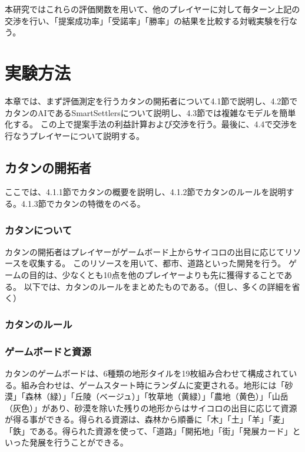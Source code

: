 \documentclass[a4, 10pt,dvipdfmx]{jsarticle}
\begin{document}
本研究ではこれらの評価関数を用いて、他のプレイヤーに対して毎ターン上記の交渉を行い、「提案成功率」「受諾率」「勝率」の結果を比較する対戦実験を行なう。

\section{実験方法}

本章では、まず評価測定を行うカタンの開拓者について4.1節で説明し、4.2節でカタンのAIであるSmartSettlersについて説明し、4.3節では複雑なモデルを簡単化する。
この上で提案手法の利益計算および交渉を行う。最後に、4.4で交渉を行なうプレイヤーについて説明する。

\subsection{カタンの開拓者}
ここでは、4.1.1節でカタンの概要を説明し、4.1.2節でカタンのルールを説明する。4.1.3節でカタンの特徴をのべる。

\subsubsection{カタンについて}
カタンの開拓者はプレイヤーがゲームボード上からサイコロの出目に応じてリソースを収集する。
このリソースを用いて、都市、道路といった開発を行う。
ゲームの目的は、少なくとも10点を他のプレイヤーよりも先に獲得することである。
以下では、カタンのルールをまとめたものである。（但し、多くの詳細を省く）
\subsubsection{カタンのルール}

\subsubsection*{ゲームボードと資源}
カタンのゲームボードは、6種類の地形タイルを19枚組み合わせて構成されている。組み合わせは、ゲームスタート時にランダムに変更される。地形には「砂漠」「森林（緑）」「丘陵（ベージュ）」「牧草地（黄緑）」「農地（黄色）」「山岳（灰色）」があり、砂漠を除いた残りの地形からはサイコロの出目に応じて資源が得る事ができる。得られる資源は、森林から順番に「木」「土」「羊」「麦」「鉄」である。得られた資源を使って、「道路」「開拓地」「街」「発展カード」といった発展を行うことができる。
\end{document}
